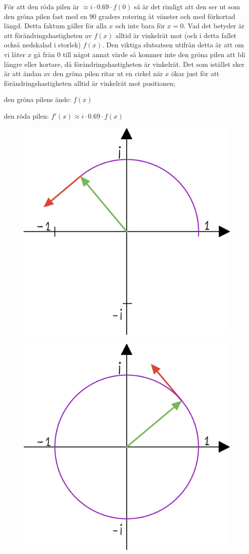 \documentclass[10pt, a4paper]{amsart}
\begin{document}
För att den röda pilen är $ \approx i \cdot 0.69 \cdot f(0) $ så är det rimligt att den ser ut som den gröna pilen fast med en 90 graders rotering åt vänster och med förkortad längd.
Detta faktum gäller för alla $ x $ och inte bara för $ x = 0 $. Vad det betyder är att förändringshastigheten av $ f(x) $ alltid är vinkelrät mot (och i detta fallet också nedskalad i storlek) $ f(x) $.
Den viktiga slutsatsen utifrån detta är att om vi låter $ x $ gå från $ 0 $ till något annat värde så kommer inte den gröna pilen att bli längre eller kortare, då förändringshastigheten är vinkelrät.
Det som istället sker är att ändan av den gröna pilen ritar ut en cirkel när $ x $ ökar just för att förändringshastigheten alltid är vinkelrät mot positionen;
\bigskip

\bigskip
\hspace{5ex}
den gröna pilens ände: $ f(x) $

\hspace{5ex}
den röda pilen: $ f'(x) \approx i \cdot 0.69 \cdot f(x) $

\begin{figure}[H]
    \includegraphics[width=50ex]{photos/chapter2/2.jpg}
\end{figure}

\begin{figure}[H]
    \includegraphics[width=50ex]{photos/chapter2/3.jpg}
\end{figure}
\end{document}
